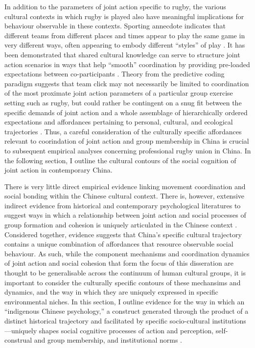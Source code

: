 {In addition to the parameters of joint action specific to rugby, the various cultural contexts in which rugby is played also have meaningful implications for behaviour observable in these contexts.  Sporting annecdote indicates that different teams from different places and times appear to play the same game in very different ways, often appearing to embody different ``styles'' of play \citep{Bourdieu1990,Taylor2010}.  It has been demonstrated that shared cultural knowledge can serve to structure joint action scenarios in ways that help ``smooth'' coordination by providing pre-loaded expectations between co-participants \citep{Vesper2017}.  Theory from the predictive coding paradigm suggests that team click may not necessarily be limited to coordination of the most proximate joint action parameters of a particular group exercise setting such as rugby, but could rather be contingent on a snug fit between the specific demands of joint action and a whole assemblage of hierarchically ordered expectations and affordances pertaining to personal, cultural, and ecological trajectories \citep{Clark2013}.  Thus, a careful consideration of the culturally specific affordances relevant to coorindation of joint action and group membership in China is crucial to subsequent empirical analyses concerning professional rugby union in China. In the following section, I outline the cultural contours of the social cognition of joint action in contemporary China.


There is very little direct empirical evidence linking movement coordination and social bonding within the Chinese cultural context. There is, however, extensive indirect evidence from historical and contemporary psychological literatures to suggest ways in which a relationship between joint action and social processes of group formation and cohesion is uniquely articulated in the Chinese context \citep{Weed2011}.  Considered together, evidence suggests that China's specific cultural trajectory contains a unique combination of affordances that resource observable social behaviour.  As such, while the component mechanisms and coordination dynamics of joint action and social cohesion that form the focus of this disseration are thought to be generalisable across the continuum of human cultural groups, it is important to consider the culturally specific contours of these mechansims and dynamics, and the way in which they are uniquely expressed in specific environmental niches.  In this section, I outline evidence for the way in which an ``indigenous Chinese psychology,'' a construct generated through the product of a distinct historical trajectory and facilitated by specific socio-cultural institutions---uniquely shapes social cognitive processes of action and perception, self-construal and group membership, and institutional norms \citep{Liu2009}.


}
